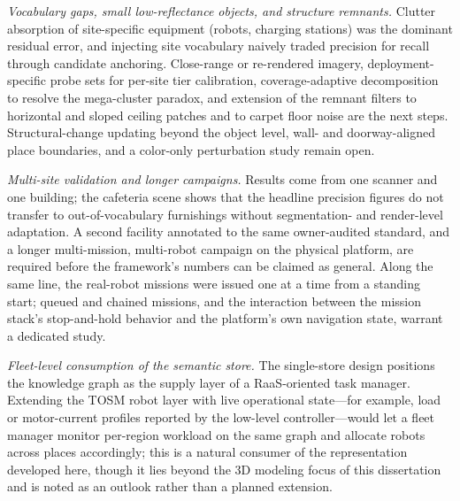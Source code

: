 \emph{Vocabulary gaps, small low-reflectance objects, and structure remnants.}
Clutter absorption of site-specific equipment (robots, charging stations) was
the dominant residual error, and injecting site vocabulary naively traded
precision for recall through candidate anchoring. Close-range or re-rendered
imagery, deployment-specific probe sets for per-site tier calibration,
coverage-adaptive decomposition to resolve the mega-cluster paradox, and
extension of the remnant filters to horizontal and sloped ceiling patches and
to carpet floor noise are the next steps. Structural-change updating beyond
the object level, wall- and doorway-aligned place boundaries, and a color-only
perturbation study remain open.

\emph{Multi-site validation and longer campaigns.} Results come from one
scanner and one building; the cafeteria scene shows that the headline
precision figures do not transfer to out-of-vocabulary furnishings without
segmentation- and render-level adaptation. A second facility annotated to the
same owner-audited standard, and a longer multi-mission, multi-robot campaign
on the physical platform, are required before the framework's numbers can be
claimed as general. Along the same line, the real-robot missions were issued
one at a time from a standing start; queued and chained missions, and the
interaction between the mission stack's stop-and-hold behavior and the
platform's own navigation state, warrant a dedicated study.

\emph{Fleet-level consumption of the semantic store.} The single-store design
positions the knowledge graph as the supply layer of a RaaS-oriented task
manager. Extending the TOSM robot layer with live operational state---for
example, load or motor-current profiles reported by the low-level
controller---would let a fleet manager monitor per-region workload on the
same graph and allocate robots across places accordingly; this is a natural
consumer of the representation developed here, though it lies beyond the 3D
modeling focus of this dissertation and is noted as an outlook rather than a
planned extension.
